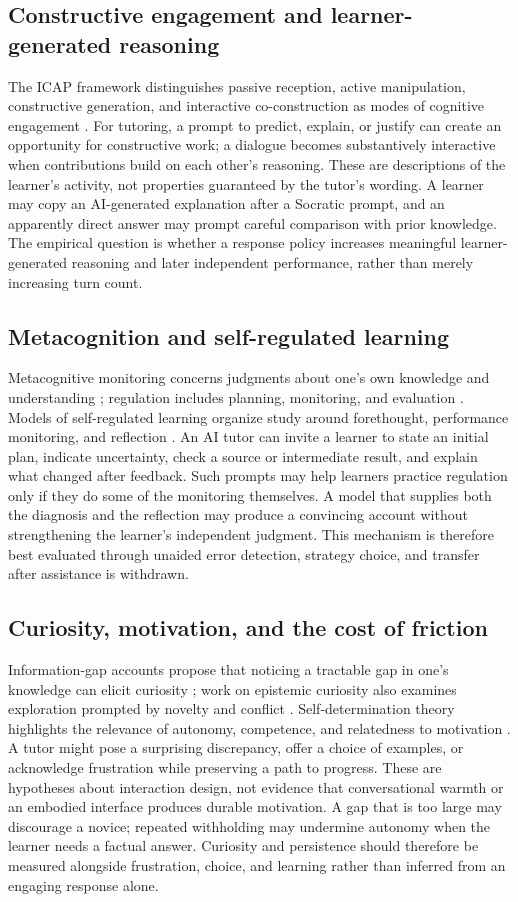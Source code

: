 \documentclass[11pt,a4paper]{article}
\begin{document}
\subsection{Constructive engagement and learner-generated reasoning}
The ICAP framework distinguishes passive reception, active manipulation, constructive generation, and interactive co-construction as modes of cognitive engagement \cite{P42}. For tutoring, a prompt to predict, explain, or justify can create an opportunity for constructive work; a dialogue becomes substantively interactive when contributions build on each other's reasoning. These are descriptions of the learner's activity, not properties guaranteed by the tutor's wording. A learner may copy an AI-generated explanation after a Socratic prompt, and an apparently direct answer may prompt careful comparison with prior knowledge. The empirical question is whether a response policy increases meaningful learner-generated reasoning and later independent performance, rather than merely increasing turn count.

\subsection{Metacognition and self-regulated learning}
Metacognitive monitoring concerns judgments about one's own knowledge and understanding \cite{T03}; regulation includes planning, monitoring, and evaluation \cite{T10}. Models of self-regulated learning organize study around forethought, performance monitoring, and reflection \cite{T04}. An AI tutor can invite a learner to state an initial plan, indicate uncertainty, check a source or intermediate result, and explain what changed after feedback. Such prompts may help learners practice regulation only if they do some of the monitoring themselves. A model that supplies both the diagnosis and the reflection may produce a convincing account without strengthening the learner's independent judgment. This mechanism is therefore best evaluated through unaided error detection, strategy choice, and transfer after assistance is withdrawn.

\subsection{Curiosity, motivation, and the cost of friction}
Information-gap accounts propose that noticing a tractable gap in one's knowledge can elicit curiosity \cite{T05}; work on epistemic curiosity also examines exploration prompted by novelty and conflict \cite{T11}. Self-determination theory highlights the relevance of autonomy, competence, and relatedness to motivation \cite{T06}. A tutor might pose a surprising discrepancy, offer a choice of examples, or acknowledge frustration while preserving a path to progress. These are hypotheses about interaction design, not evidence that conversational warmth or an embodied interface produces durable motivation. A gap that is too large may discourage a novice; repeated withholding may undermine autonomy when the learner needs a factual answer. Curiosity and persistence should therefore be measured alongside frustration, choice, and learning rather than inferred from an engaging response alone.
\end{document}
